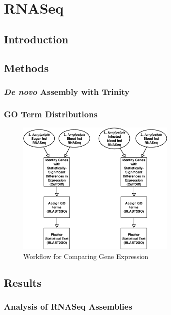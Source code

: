 \section{RNASeq}

\subsection{Introduction}

\subsection{Methods}

\subsubsection{\emph{De novo} Assembly with Trinity}

\subsubsection{GO Term Distributions}

\begin{figure}[H]
  \centering
  \includegraphics[width=0.7\textwidth]{figures/rnaseq/cuffdiff_workflow}
  \caption{Workflow for Comparing Gene Expression}
  \label{fig:rnaseq-cuffdiff-workflow}
\end{figure}

\subsection{Results}

\subsubsection{Analysis of RNASeq Assemblies}

